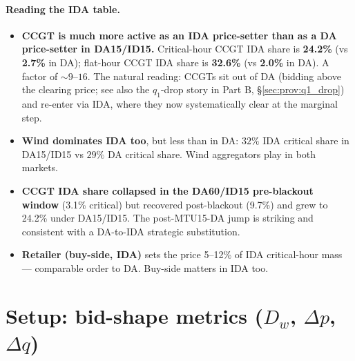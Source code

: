 \documentclass[11pt,a4paper]{article}
\begin{document}
\paragraph{Reading the IDA table.}
\begin{itemize}
\item \textbf{CCGT is much more active as an IDA price-setter than as a DA price-setter in DA15/ID15.} Critical-hour CCGT IDA share is \textbf{24.2\%} (vs \textbf{2.7\%} in DA); flat-hour CCGT IDA share is \textbf{32.6\%} (vs \textbf{2.0\%} in DA). A factor of $\sim 9$--$16$. The natural reading: CCGTs sit out of DA (bidding above the clearing price; see also the $q_1$-drop story in Part B, \S\ref{sec:prov:q1_drop}) and re-enter via IDA, where they now systematically clear at the marginal step.
\item \textbf{Wind dominates IDA too}, but less than in DA: $32\%$ IDA critical share in DA15/ID15 vs $29\%$ DA critical share. Wind aggregators play in both markets.
\item \textbf{CCGT IDA share collapsed in the DA60/ID15 pre-blackout window} (3.1\% critical) but recovered post-blackout (9.7\%) and grew to 24.2\% under DA15/ID15. The post-MTU15-DA jump is striking and consistent with a DA-to-IDA strategic substitution.
\item \textbf{Retailer (buy-side, IDA)} sets the price 5--12\% of IDA critical-hour mass — comparable order to DA. Buy-side matters in IDA too.
\end{itemize}


\section{Setup: bid-shape metrics ($D_w$, $\Delta p$, $\Delta q$)}\label{sec:prov:dw_decomp}
\end{document}
